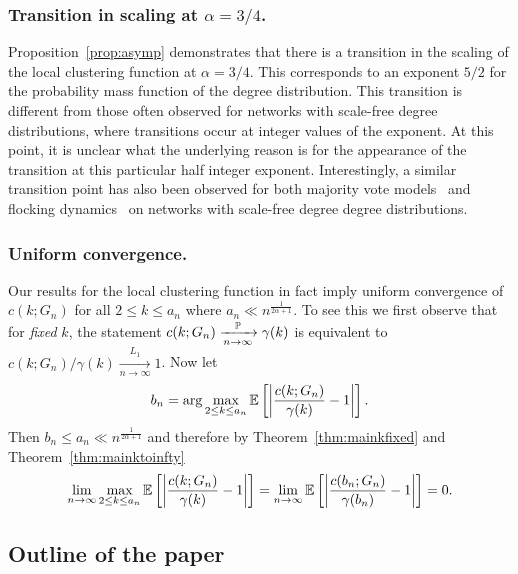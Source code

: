 \subsubsection{Transition in scaling at \texorpdfstring{$\alpha = 3/4$}{alpha equals 3/4}.}


Proposition~\ref{prop:asymp} demonstrates that there is a transition in the scaling of the local clustering 
function at $\alpha = 3/4$. 
This corresponds to an exponent $5/2$ for the probability mass function of the degree distribution. 
This transition is different from those often observed for networks with scale-free degree distributions, where transitions occur at
integer values of the exponent. 
At this point, it is unclear what the underlying reason is for the appearance of the transition at this particular half integer 
exponent. 
Interestingly, a similar transition point has also been observed for both majority vote models~\cite{chen2015critical} and 
flocking dynamics~\cite{miguel2018effects} on networks with scale-free degree degree distributions.


\subsubsection{Uniform convergence.}

Our results for the local clustering function in fact imply uniform convergence of $c(k; G_n)$ for all $2 \le k \le a_n$ 
where $a_n \ll n^{\frac{1}{2\alpha + 1}}$. 
To see this we first observe that for {\em fixed} $k$, the statement $c(k;G_n) \xrightarrow[n\to\infty]{\mathbb{P}} \gamma(k)$
is equivalent to $c(k;G_n)/\gamma(k) \xrightarrow[n\to\infty]{L_1} 1$.
Now let
\[
	b_n = \arg \max_{2 \le k \le a_n} \mathbb{E}\left[\left|\frac{c(k; G_n)}{\gamma(k)} - 1\right|\right].
\]
Then $b_n \le a_n \ll n^{\frac{1}{2\alpha + 1}}$ and therefore by Theorem~\ref{thm:mainkfixed} and Theorem~\ref{thm:mainktoinfty}
\[
	\lim_{n \to \infty} \max_{2 \le k \le a_n} \mathbb{E}\left[\left|\frac{c(k; G_n)}{\gamma(k)} - 1\right|\right] 
	= \lim_{n \to \infty}\mathbb{E}\left[\left|\frac{c(b_n; G_n)}{\gamma(b_n)} - 1\right|\right] = 0.
\]



\subsection{Outline of the paper}


